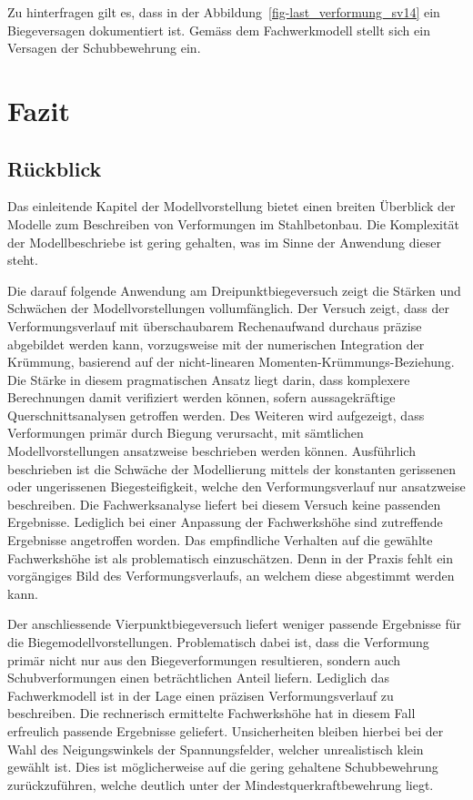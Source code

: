 \documentclass[
  12pt,
  letterpaper,
  egregdoesnotlikesansseriftitles]{scrreprt}
\begin{document}
Zu hinterfragen gilt es, dass in der
Abbildung~\ref{fig-last_verformung_sv14} ein Biegeversagen dokumentiert
ist. Gemäss dem Fachwerkmodell stellt sich ein Versagen der
Schubbewehrung ein.


\hypertarget{fazit}{%
\chapter{Fazit}\label{fazit}}

\hypertarget{ruxfcckblick}{%
\section{Rückblick}\label{ruxfcckblick}}

Das einleitende Kapitel der Modellvorstellung bietet einen breiten
Überblick der Modelle zum Beschreiben von Verformungen im Stahlbetonbau.
Die Komplexität der Modellbeschriebe ist gering gehalten, was im Sinne
der Anwendung dieser steht.

Die darauf folgende Anwendung am Dreipunktbiegeversuch zeigt die Stärken
und Schwächen der Modellvorstellungen vollumfänglich. Der Versuch zeigt,
dass der Verformungsverlauf mit überschaubarem Rechenaufwand durchaus
präzise abgebildet werden kann, vorzugsweise mit der numerischen
Integration der Krümmung, basierend auf der nicht-linearen
Momenten-Krümmungs-Beziehung. Die Stärke in diesem pragmatischen Ansatz
liegt darin, dass komplexere Berechnungen damit verifiziert werden
können, sofern aussagekräftige Querschnittsanalysen getroffen werden.
Des Weiteren wird aufgezeigt, dass Verformungen primär durch Biegung
verursacht, mit sämtlichen Modellvorstellungen ansatzweise beschrieben
werden können. Ausführlich beschrieben ist die Schwäche der Modellierung
mittels der konstanten gerissenen oder ungerissenen Biegesteifigkeit,
welche den Verformungsverlauf nur ansatzweise beschreiben. Die
Fachwerksanalyse liefert bei diesem Versuch keine passenden Ergebnisse.
Lediglich bei einer Anpassung der Fachwerkshöhe sind zutreffende
Ergebnisse angetroffen worden. Das empfindliche Verhalten auf die
gewählte Fachwerkshöhe ist als problematisch einzuschätzen. Denn in der
Praxis fehlt ein vorgängiges Bild des Verformungsverlaufs, an welchem
diese abgestimmt werden kann.

Der anschliessende Vierpunktbiegeversuch liefert weniger passende
Ergebnisse für die Biegemodellvorstellungen. Problematisch dabei ist,
dass die Verformung primär nicht nur aus den Biegeverformungen
resultieren, sondern auch Schubverformungen einen beträchtlichen Anteil
liefern. Lediglich das Fachwerkmodell ist in der Lage einen präzisen
Verformungsverlauf zu beschreiben. Die rechnerisch ermittelte
Fachwerkshöhe hat in diesem Fall erfreulich passende Ergebnisse
geliefert. Unsicherheiten bleiben hierbei bei der Wahl des
Neigungswinkels der Spannungsfelder, welcher unrealistisch klein gewählt
ist. Dies ist möglicherweise auf die gering gehaltene Schubbewehrung
zurückzuführen, welche deutlich unter der Mindestquerkraftbewehrung
liegt.
\end{document}
